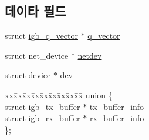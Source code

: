 \subsection*{데이타 필드}
\begin{DoxyCompactItemize}
\item 
struct \hyperlink{structigb__q__vector}{igb\+\_\+q\+\_\+vector} $\ast$ \hyperlink{structigb__ring_aa100c4670cf68cffe85570de281b83ce}{q\+\_\+vector}
\item 
struct net\+\_\+device $\ast$ \hyperlink{structigb__ring_a5b3eca5b24cb88421c27369d02ebe884}{netdev}
\item 
struct device $\ast$ \hyperlink{structigb__ring_acf6a82c73e7a9d99293d9ce0b8837faf}{dev}
\item 
\begin{tabbing}
xx\=xx\=xx\=xx\=xx\=xx\=xx\=xx\=xx\=\kill
union \{\\
\>struct \hyperlink{structigb__tx__buffer}{igb\_tx\_buffer} $\ast$ \hyperlink{structigb__ring_a597a573b63aa80ad839fab10dac560b8}{tx\_buffer\_info}\\
\>struct \hyperlink{structigb__rx__buffer}{igb\_rx\_buffer} $\ast$ \hyperlink{structigb__ring_af38f66b76bb1c6753b43e578c9558e23}{rx\_buffer\_info}\\
\}; \\


\end{tabbing}
\end{DoxyCompactItemize}
